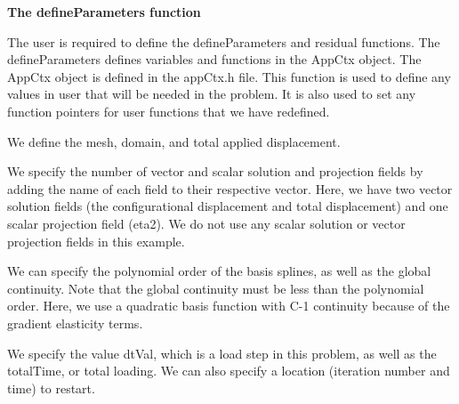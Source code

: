 \begin{DoxyCodeInclude}

\end{DoxyCodeInclude}


{\bfseries  The {\ttfamily define\-Parameters} function }

The user is required to define the {\ttfamily define\-Parameters} and {\ttfamily residual} functions. The {\ttfamily define\-Parameters} defines variables and functions in the {\ttfamily App\-Ctx} object. The {\ttfamily App\-Ctx} object is defined in the app\-Ctx.\-h file. This function is used to define any values in {\ttfamily user} that will be needed in the problem. It is also used to set any function pointers for user functions that we have redefined.


\begin{DoxyCodeInclude}

\end{DoxyCodeInclude}


We define the mesh, domain, and total applied displacement.


\begin{DoxyCodeInclude}

\end{DoxyCodeInclude}


We specify the number of vector and scalar solution and projection fields by adding the name of each field to their respective vector. Here, we have two vector solution fields (the configurational displacement and total displacement) and one scalar projection field (eta2). We do not use any scalar solution or vector projection fields in this example.


\begin{DoxyCodeInclude}

\end{DoxyCodeInclude}


We can specify the polynomial order of the basis splines, as well as the global continuity. Note that the global continuity must be less than the polynomial order. Here, we use a quadratic basis function with C-\/1 continuity because of the gradient elasticity terms.


\begin{DoxyCodeInclude}

\end{DoxyCodeInclude}


We specify the value {\ttfamily dt\-Val}, which is a load step in this problem, as well as the {\ttfamily total\-Time}, or total loading. We can also specify a location (iteration number and time) to restart.


